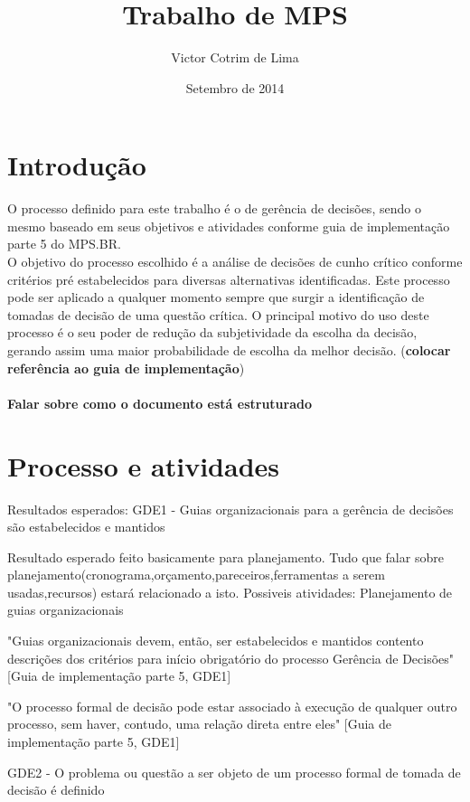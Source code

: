 \documentclass{article}
\title{Trabalho de MPS}
\author{Victor Cotrim de Lima }
\date{Setembro de 2014}
\begin{document}
\maketitle


\section{Introdução}
O processo definido para este trabalho é o de gerência de decisões, sendo o mesmo baseado em seus objetivos e atividades conforme guia de implementação parte 5 do MPS.BR.\\
O objetivo do processo escolhido é a análise de decisões de cunho crítico conforme critérios pré estabelecidos para diversas alternativas identificadas. Este processo pode ser aplicado a qualquer momento sempre que surgir a identificação de tomadas de decisão de uma questão crítica. O principal motivo do uso deste processo é o seu poder de redução da subjetividade da escolha da decisão, gerando assim uma maior probabilidade de escolha da melhor decisão. (\textbf{colocar referência ao guia de implementação})
\paragraph{Falar sobre como o documento está estruturado}

\section{Processo e atividades} 


	Resultados esperados:
	GDE1 - Guias organizacionais para a gerência de decisões são estabelecidos e mantidos
	
		Resultado esperado feito basicamente para planejamento. Tudo que falar sobre planejamento(cronograma,orçamento,pareceiros,ferramentas a serem usadas,recursos) estará relacionado a isto.
		Possiveis atividades:
			Planejamento de guias organizacionais
										
	"Guias organizacionais devem, então, ser estabelecidos e mantidos contento descrições dos critérios para início obrigatório do processo Gerência de Decisões"[Guia de implementação parte 5, GDE1]
				
	"O processo formal de decisão pode estar associado à execução de qualquer outro processo, sem haver, contudo, uma relação direta entre eles" [Guia de implementação parte 5, GDE1]
	

	GDE2 - O problema ou questão a ser objeto de um processo formal de tomada de decisão é definido
		
\end{document}
